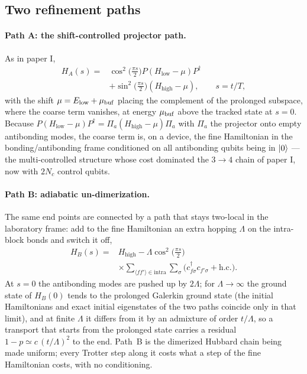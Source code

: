 \documentclass[a4paper,11pt,noarxiv]{quantumarticle}
\newcommand{\Hlow}{H_{\mathrm{low}}}
\newcommand{\Hhigh}{H_{\mathrm{high}}}
\begin{document}
\subsection{Two refinement paths}
\label{sec:paths}
\paragraph{Path A: the shift-controlled projector path.}
As in paper I,
\begin{align}
  H_A(s)={}&\cos^2\!\big(\tfrac{\pi s}{2}\big)P(\Hlow-\mu)P^\dagger\nonumber\\
        &+\sin^2\!\big(\tfrac{\pi s}{2}\big)(\Hhigh-\mu),\qquad s=t/T,
  \label{eq:pathA}
\end{align}
with the shift $\mu=E_{\rm low}+\mu_{\rm buf}$ placing the complement of the
prolonged subspace, where the coarse term vanishes, at energy $\mu_{\rm buf}$
above the tracked state at $s=0$.  Because
$P(\Hlow-\mu)P^\dagger=\Pi_a(\Hhigh-\mu)\Pi_a$ with $\Pi_a$ the projector
onto empty antibonding modes, the coarse term is, on a device, the fine
Hamiltonian in the bonding/antibonding frame conditioned on all antibonding
qubits being in $\ket0$ --- the multi-controlled structure whose cost
dominated the $3\to4$ chain of paper I, now with $2N_c$ control qubits.

\paragraph{Path B: adiabatic un-dimerization.}
The same end points are connected by a path that stays two-local in the
laboratory frame: add to the fine Hamiltonian an extra hopping $\Lambda$ on
the intra-block bonds and switch it off,
\begin{align}
  H_B(s)={}&\Hhigh-\Lambda\cos^2\!\big(\tfrac{\pi s}{2}\big)\nonumber\\
  &\times\sum_{\langle ff'\rangle\in\mathrm{intra}}\sum_\sigma
  \big(c^\dagger_{f\sigma}c_{f'\sigma}+\mathrm{h.c.}\big).
  \label{eq:pathB}
\end{align}
At $s=0$ the antibonding modes are pushed up by $2\Lambda$; for
$\Lambda\to\infty$ the ground state of $H_B(0)$ tends to the prolonged
Galerkin ground state (the initial Hamiltonians and exact initial
eigenstates of the two paths coincide only in that limit), and at finite
$\Lambda$ it differs from it by an admixture of order $t/\Lambda$, so a
transport that starts from the prolonged state carries a residual
$1-p\simeq c\,(t/\Lambda)^2$ to the end.  Path~B is the
dimerized Hubbard chain being made uniform; every Trotter step along it
costs what a step of the fine Hamiltonian costs, with no conditioning.
\end{document}
